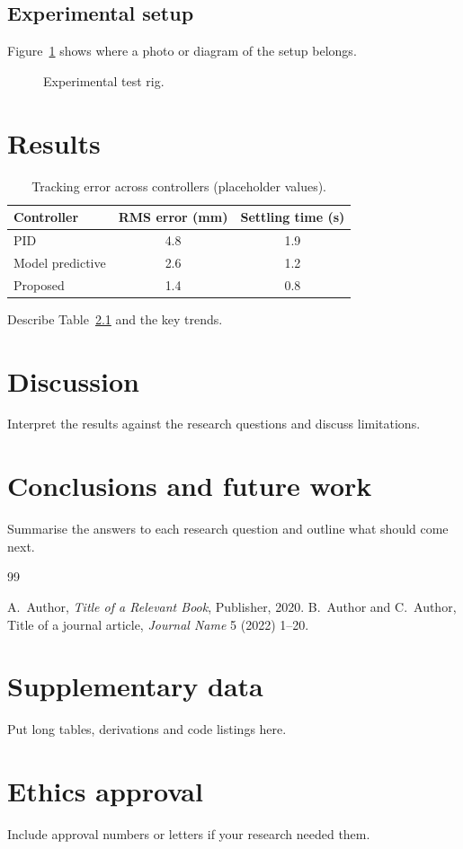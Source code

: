 \documentclass[12pt,a4paper,oneside]{report}
\begin{document}
\section{Experimental setup}
Figure~\ref{fig:setup} shows where a photo or diagram of the setup belongs.
\begin{figure}[ht]
  \centering
  \caption{Experimental test rig.}
  \label{fig:setup}
\end{figure}

\chapter{Results}
\label{ch:results}
\begin{table}[ht]
  \centering
  \caption{Tracking error across controllers (placeholder values).}
  \label{tab:error}
  \begin{tabular}{lcc}
    \toprule
    Controller & RMS error (mm) & Settling time (s) \\
    \midrule
    PID & 4.8 & 1.9 \\
    Model predictive & 2.6 & 1.2 \\
    Proposed & 1.4 & 0.8 \\
    \bottomrule
  \end{tabular}
\end{table}
Describe Table~\ref{tab:error} and the key trends.

\chapter{Discussion}
Interpret the results against the research questions and discuss limitations.

\chapter{Conclusions and future work}
Summarise the answers to each research question and outline what should come next.

\begin{thebibliography}{99}
 A.~Author, \emph{Title of a Relevant Book}, Publisher, 2020.
 B.~Author and C.~Author, Title of a journal article, \emph{Journal Name} 5 (2022) 1--20.
\end{thebibliography}

\begin{appendices}
\chapter{Supplementary data}
Put long tables, derivations and code listings here.
\chapter{Ethics approval}
Include approval numbers or letters if your research needed them.
\end{appendices}
\end{document}
